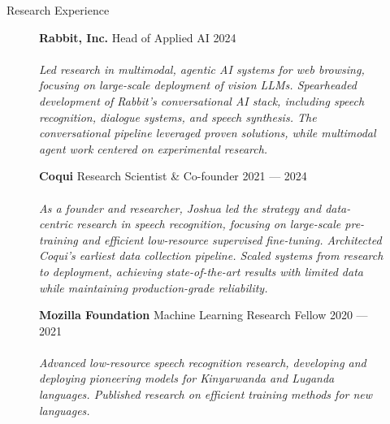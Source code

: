 \documentclass{cv} %
\begin{document}
\begin{rSection}{Research Experience}

  \begin{figure}[H]
    \begin{minipage}{0.2\textwidth}
      \centering
        
      \end{minipage}
      \begin{minipage}{0.8\textwidth}
          {\bf Rabbit, Inc.} \hfill Head of Applied AI \hspace{0.5cm} {2024} \\ \\
          \textit{Led research in multimodal, agentic AI systems for web browsing, focusing on large-scale deployment of vision LLMs. Spearheaded development of Rabbit's conversational AI stack, including speech recognition, dialogue systems, and speech synthesis. The conversational pipeline leveraged proven solutions, while multimodal agent work centered on experimental research.}
      \end{minipage}
  \end{figure}

  \begin{figure}[H]
    \begin{minipage}{0.2\textwidth}
      \centering
        
      \end{minipage}
      \begin{minipage}{0.8\textwidth}
          {\bf Coqui} \hfill Research Scientist \& Co-founder \hspace{0.5cm} {2021 --- 2024} \\ \\
          \textit{As a founder and researcher, Joshua led the strategy and data-centric research in speech recognition, focusing on large-scale pre-training and efficient low-resource supervised fine-tuning. Architected Coqui's earliest data collection pipeline. Scaled systems from research to deployment, achieving state-of-the-art results with limited data while maintaining production-grade reliability.}
      \end{minipage}
  \end{figure}

  \begin{figure}[H]
    \begin{minipage}{0.2\textwidth}
      \centering
      
    \end{minipage}
    \begin{minipage}{0.8\textwidth}
      {\bf Mozilla Foundation} \hfill Machine Learning Research Fellow \hspace{0.5cm} {2020 --- 2021} \\ \\
      \textit{Advanced low-resource speech recognition research, developing and deploying pioneering models for Kinyarwanda and Luganda languages. Published research on efficient training methods for new languages.}
    \end{minipage}
  \end{figure}


\end{rSection}
\end{document}
